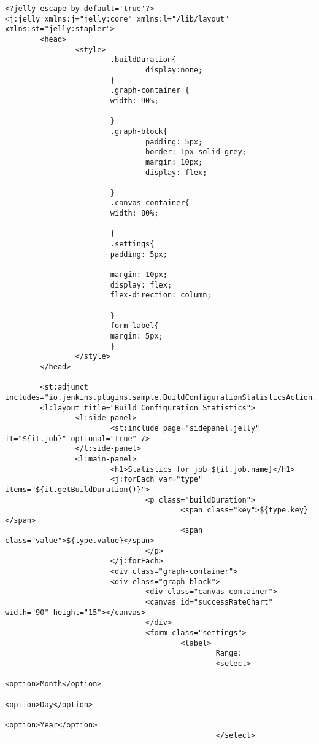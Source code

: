 \begin{lstlisting}
<?jelly escape-by-default='true'?>
<j:jelly xmlns:j="jelly:core" xmlns:l="/lib/layout" xmlns:st="jelly:stapler">
        <head>
                <style>
                        .buildDuration{
                                display:none;
                        }
                        .graph-container {
                        width: 90%;

                        }
                        .graph-block{
                                padding: 5px;
                                border: 1px solid grey;
                                margin: 10px;
                                display: flex;

                        }
                        .canvas-container{
                        width: 80%;

                        }
                        .settings{
                        padding: 5px;

                        margin: 10px;
                        display: flex;
                        flex-direction: column;

                        }
                        form label{
                        margin: 5px;
                        }
                </style>
        </head>

        <st:adjunct includes="io.jenkins.plugins.sample.BuildConfigurationStatisticsAction.declareChartJsClickArray"/>
        <l:layout title="Build Configuration Statistics">
                <l:side-panel>
                        <st:include page="sidepanel.jelly" it="${it.job}" optional="true" />
                </l:side-panel>
                <l:main-panel>
                        <h1>Statistics for job ${it.job.name}</h1>
                        <j:forEach var="type" items="${it.getBuildDuration()}">
                                <p class="buildDuration">
                                        <span class="key">${type.key}</span>
                                        <span class="value">${type.value}</span>
                                </p>
                        </j:forEach>
                        <div class="graph-container">
                        <div class="graph-block">
                                <div class="canvas-container">
                                <canvas id="successRateChart" width="90" height="15"></canvas>
                                </div>
                                <form class="settings">
                                        <label>
                                                Range:
                                                <select>
                                                        <option>Month</option>
                                                        <option>Day</option>
                                                        <option>Year</option>
                                                </select>


\end{lstlisting}
